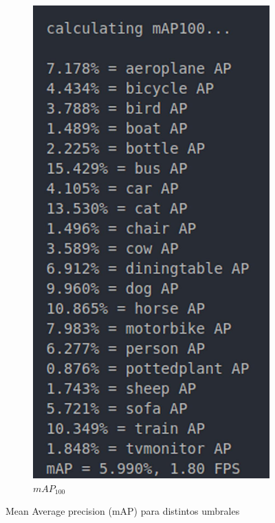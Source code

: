 \begin{figure}[H]
     \hfill
     \begin{subfigure}[b]{0.4\textwidth}
         \centering
        \includegraphics[scale=0.15]{Recursos/mAP100_result.jpg}
        \caption{$mAP_{100}$}
        \label{mAP_100_result}
     \end{subfigure}
\caption{Mean Average precision (mAP) para distintos umbrales}
\label{mAP_results}
\end{figure}
